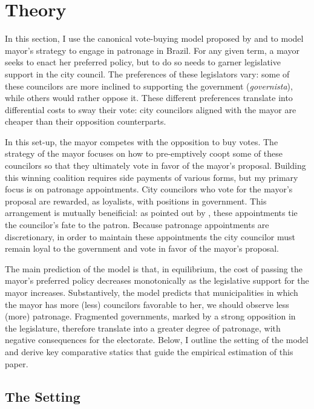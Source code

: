 \documentclass[12pt,a4paper]{article}
\begin{document}
\section*{Theory}

In this section, I use the canonical vote-buying model proposed by \citet{groseclose_1996_buying} and \citet{banks_2000_buying} to model mayor's strategy to engage in patronage in Brazil. For any given term, a mayor seeks to enact her preferred policy, but to do so needs to garner legislative support in the city council. The preferences of these legislators vary: some of these councilors are more inclined to supporting the government (\emph{governista}), while others would rather oppose it. These different preferences translate into differential costs to sway their vote: city councilors aligned with the mayor are cheaper than their opposition counterparts.

In this set-up, the mayor competes with the opposition to buy votes. The strategy of the mayor focuses on how to pre-emptively coopt some of these councilors so that they ultimately vote in favor of the mayor's proposal. Building this winning coalition requires side payments of various forms, but my primary focus is on patronage appointments. City councilors who vote for the mayor's proposal are rewarded, as loyalists, with positions in government. This arrangement is mutually beneificial: as pointed out by \citet{robinson_political_2013}, these appointments tie the councilor's fate to the patron. Because patronage appointments are discretionary, in order to maintain these appointments the city councilor must remain loyal to the government and vote in favor of the mayor's proposal.

The main prediction of the model is that, in equilibrium, the cost of passing the mayor's preferred policy decreases monotonically as the legislative support for the mayor increases. Substantively, the model predicts that municipalities in which the mayor has more (less) councilors favorable to her, we should observe less (more) patronage. Fragmented governments, marked by a strong opposition in the legislature, therefore translate into a greater degree of patronage, with negative consequences for the electorate. Below, I outline the setting of the model and derive key comparative statics that guide the empirical estimation of this paper.

\subsection*{The Setting}
\end{document}
